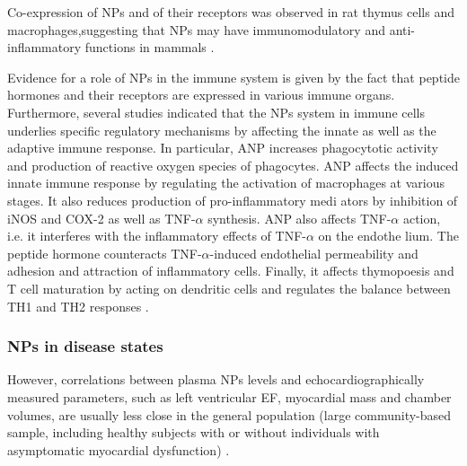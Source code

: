 \documentclass[14pt,a4paper,onecolumn]{extarticle}
\begin{document}
Co-expression of NPs and of their receptors was observed in rat thymus cells and macrophages,suggesting that NPs may have immunomodulatory and anti-inflammatory functions in mammals \citep{106}.

Evidence for a role of NPs in the immune system is given by the fact that peptide hormones and their receptors are expressed in various immune organs. Furthermore, several studies indicated that the NPs system in immune cells underlies specific regulatory mechanisms by affecting the innate as well as the adaptive immune response. In particular, ANP increases phagocytotic activity and production of reactive oxygen species of phagocytes. ANP affects the induced innate immune response by regulating the activation of macrophages at various stages. It also reduces production of pro-inflammatory medi ators by inhibition of iNOS and COX-2 as well as TNF-$\alpha$ synthesis. ANP also affects TNF-$\alpha$ action, i.e. it interferes with the inflammatory effects of TNF-$\alpha$ on the endothe lium. The peptide hormone counteracts TNF-$\alpha$-induced endothelial permeability and adhesion and attraction of inflammatory cells. Finally, it affects thymopoesis and T cell maturation by acting on dendritic cells and regulates the balance between TH1 and TH2 responses \citep{99}. %




\subsubsection{NPs in disease states}

However, correlations between plasma NPs levels and echocardiographically measured parameters, such as left ventricular EF, myocardial mass and chamber volumes, are usually less close in the general population (large community-based sample, including healthy subjects with or without individuals with asymptomatic myocardial dysfunction) \citep{bib38} \citep{bib39} \citep{bib366} \citep{bib367}. %
\end{document}
